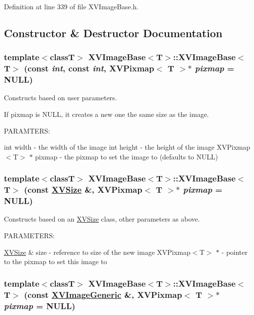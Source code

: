Definition at line 339 of file XVImage\-Base.h.

\subsection{Constructor \& Destructor Documentation}
\label{XVImageBase_a18}
\hypertarget{class_XVImageBase_a18}{
\subsubsection[XVImageBase]{\setlength{\rightskip}{0pt plus 5cm}template$<$classT$>$ XVImage\-Base$<$T$>$::XVImage\-Base$<$T$>$ (const {\em int}, const {\em int}, XVPixmap$<$ T $>$$\ast$ {\em pixmap} = NULL)}}


Constructs based on user parameters.

If pixmap is NULL, it creates a new one the same size as the image.

PARAMTERS:

int width - the width of the image int height - the height of the image XVPixmap$<$T$>$ $\ast$ pixmap - the pixmap to set the image to (defaults to NULL) \label{XVImageBase_a19}
\hypertarget{class_XVImageBase_a19}{
\subsubsection[XVImageBase]{\setlength{\rightskip}{0pt plus 5cm}template$<$classT$>$ XVImage\-Base$<$T$>$::XVImage\-Base$<$T$>$ (const \hyperlink{class_XVSize}{XVSize} \&, XVPixmap$<$ T $>$$\ast$ {\em pixmap} = NULL)}}


Constructs based on an \hyperlink{class_XVSize}{XVSize} class, other parameters as above.

PARAMETERS:

\hyperlink{class_XVSize}{XVSize} \& size - reference to size of the new image XVPixmap$<$T$>$ $\ast$ - pointer to the pixmap to set this image to \label{XVImageBase_a20}
\hypertarget{class_XVImageBase_a20}{
\subsubsection[XVImageBase]{\setlength{\rightskip}{0pt plus 5cm}template$<$classT$>$ XVImage\-Base$<$T$>$::XVImage\-Base$<$T$>$ (const \hyperlink{class_XVImageGeneric}{XVImage\-Generic} \&, XVPixmap$<$ T $>$$\ast$ {\em pixmap} = NULL)}}


